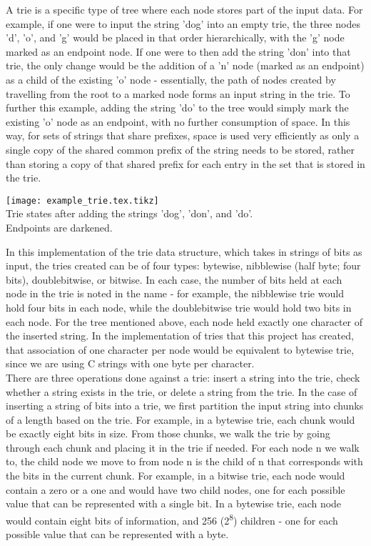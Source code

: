 \documentclass{llncs}
\begin{document}
A trie is a specific type of tree where each node stores part of the input data. For example, if one were to input the string 'dog' into an empty trie, the three nodes 'd', 'o', and 'g' would be placed in that order hierarchically, with the 'g' node marked as an endpoint node. If one were to then add the string 'don' into that trie, the only change would be the addition of a 'n' node (marked as an endpoint) as a child of the existing 'o' node - essentially, the path of nodes created by travelling from the root to a marked node forms an input string in the trie. To further this example, adding the string 'do' to the tree would simply mark the existing 'o' node as an endpoint, with no further consumption of space. In this way, for sets of strings that share prefixes, space is used very efficiently as only a single copy of the shared common prefix of the string needs to be stored, rather than storing a copy of that shared prefix for each entry in the set that is stored in the trie. \\ 
\begin{center}
\texttt{[image: example\_trie.tex.tikz]}
\\
Trie states after adding the strings 'dog', 'don', and 'do'.\\
Endpoints are darkened.\\
\end{center}
In this implementation of the trie data structure, which takes in strings of bits as input, the tries created can be of four types: bytewise, nibblewise (half byte; four bits), doublebitwise, or bitwise. In each case, the number of bits held at each node in the trie is noted in the name - for example, the nibblewise trie would hold four bits in each node, while the doublebitwise trie would hold two bits in each node. For the tree mentioned above, each node held exactly one character of the inserted string. In the implementation of tries that this project has created, that association of one character per node would be equivalent to bytewise trie, since we are using C strings with one byte per character. \\
There are three operations done against a trie: insert a string into the trie, check whether a string exists in the trie, or delete a string from the trie. In the case of inserting a string of bits into a trie, we first partition the input string into chunks of a length based on the trie. For example, in a bytewise trie, each chunk would be exactly eight bits in size. From those chunks, we walk the trie by going through each chunk and placing it in the trie if needed. For each node n we walk to, the child node we move to from node n is the child of n that corresponds with the bits in the current chunk. For example, in a bitwise trie, each node would contain a zero or a one and would have two child nodes, one for each possible value that can be represented with a single bit. In a bytewise trie, each node would contain eight bits of information, and 256 (2\textsuperscript{8}) children - one for each possible value that can be represented with a byte. \\
\end{document}
